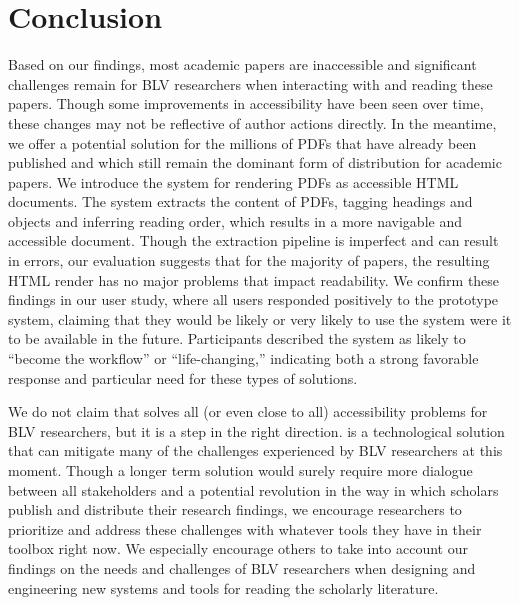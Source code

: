 \section{Conclusion}

Based on our findings, most academic papers are inaccessible and significant challenges remain for BLV researchers when interacting with and reading these papers. Though some improvements in accessibility have been seen over time, these changes may not be reflective of author actions directly. In the meantime, we offer a potential solution for the millions of PDFs that have already been published and which still remain the dominant form of distribution for academic papers. We introduce the \scially system for rendering PDFs as accessible HTML documents. The system extracts the content of PDFs, tagging headings and objects and inferring reading order, which results in a more navigable and accessible document. Though the extraction pipeline is imperfect and can result in errors, our evaluation suggests that for the majority of papers, the resulting HTML render has no major problems that impact readability. We confirm these findings in our user study, where all users responded positively to the prototype system, claiming that they would be likely or very likely to use the system were it to be available in the future. Participants described the system as likely to ``become the workflow'' or ``life-changing,'' indicating both a strong favorable response and particular need for these types of solutions.

We do not claim that \scially solves all (or even close to all) accessibility problems for BLV researchers, but it is a step in the right direction.  \scially is a technological solution that can mitigate many of the challenges experienced by BLV researchers at this moment. Though a longer term solution would surely require more dialogue between all stakeholders and a potential revolution in the way in which scholars publish and distribute their research findings, we encourage researchers to prioritize and address these challenges with whatever tools they have in their toolbox right now. We especially encourage others to take into account our findings on the needs and challenges of BLV researchers when designing and engineering new systems and tools for reading the scholarly literature.